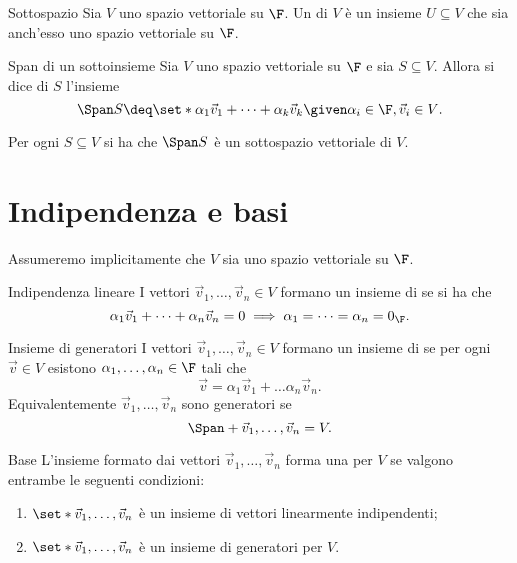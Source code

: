 \begin{definition}
    {Sottospazio}{}
    Sia $V$ uno spazio vettoriale su $\F$. Un  di $V$ è un insieme $U \subseteq V$ che sia anch'esso uno spazio vettoriale su $\F$. 
\end{definition}

\begin{definition}
    {Span di un sottoinsieme}{}
    Sia $V$ uno spazio vettoriale su $\F$ e sia $S \subseteq V$. Allora si dice  di $S$ l'insieme \[
        \Span S \deq \set*{\alpha_1 \vec v_1 + \dots + \alpha_k \vec v_k \given \alpha_i \in \F, \vec v_i \in V}.
    \]  
\end{definition}

\begin{proposition}{}{}
    Per ogni $S \subseteq V$ si ha che $\Span S$ è un sottospazio vettoriale di $V$.
\end{proposition}

\section{Indipendenza e basi}

Assumeremo implicitamente che $V$ sia uno spazio vettoriale su $\F$.

\begin{definition}
    {Indipendenza lineare}{}
    I vettori $\vec v_1, \dots, \vec v_n \in V$ formano un insieme di  se si ha che \[
        \alpha_1\vec v_1 + \dots + \alpha_n\vec v_n = 0 \implies \alpha_1 = \dots = \alpha_n = 0_{\F}.
    \]
\end{definition}

\begin{definition}
    {Insieme di generatori}{}
    I vettori $\vec v_1, \dots, \vec v_n \in V$ formano un insieme di  se per ogni $\vec v \in V$ esistono $\alpha_1, \dots, \alpha_n \in \F$ tali che \[
        \vec v = \alpha_1 \vec v_1 + \dots \alpha_n\vec v_n.
    \] Equivalentemente $\vec v_1, \dots, \vec v_n$ sono generatori se \[
        \Span+{\vec v_1, \dots, \vec v_n} = V.
    \] 
\end{definition}

\begin{definition}
    {Base}{}
    L'insieme formato dai vettori $\vec v_1, \dots, \vec v_n$ forma una  per $V$ se valgono entrambe le seguenti condizioni:
    \begin{enumerate}
        \item $\set*{\vec v_1, \dots, \vec v_n}$ è un insieme di vettori linearmente indipendenti;
        \item $\set*{\vec v_1, \dots, \vec v_n}$ è un insieme di generatori per $V$.
    \end{enumerate}
\end{definition}

